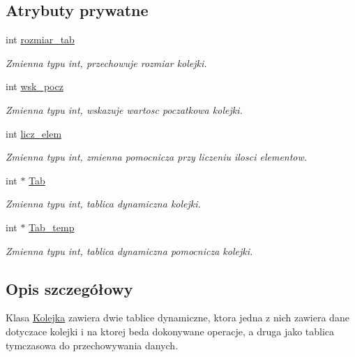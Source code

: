 \subsection*{\-Atrybuty prywatne}
\begin{DoxyCompactItemize}
\item 
int \hyperlink{class_kolejka_a72ba80c6ad16d9e2f5a8a02ec257524b}{rozmiar\-\_\-tab}
\begin{DoxyCompactList}\small\item\em \-Zmienna typu int, przechowuje rozmiar kolejki. \end{DoxyCompactList}\item 
int \hyperlink{class_kolejka_a9fc9f63fded5c275d32f8b05125e8428}{wsk\-\_\-pocz}
\begin{DoxyCompactList}\small\item\em \-Zmienna typu int, wskazuje wartosc poczatkowa kolejki. \end{DoxyCompactList}\item 
int \hyperlink{class_kolejka_a563cd8e3ecaf570a6f8068db62d6c099}{licz\-\_\-elem}
\begin{DoxyCompactList}\small\item\em \-Zmienna typu int, zmienna pomocnicza przy liczeniu ilosci elementow. \end{DoxyCompactList}\item 
int $\ast$ \hyperlink{class_kolejka_adfbcda2500bf9d82a22d8d717ee6f695}{\-Tab}
\begin{DoxyCompactList}\small\item\em \-Zmienna typu int, tablica dynamiczna kolejki. \end{DoxyCompactList}\item 
int $\ast$ \hyperlink{class_kolejka_a5ec5307ce26f31ae9c29f91bd7527225}{\-Tab\-\_\-temp}
\begin{DoxyCompactList}\small\item\em \-Zmienna typu int, tablica dynamiczna pomocnicza kolejki. \end{DoxyCompactList}\end{DoxyCompactItemize}


\subsection{\-Opis szczegółowy}
\-Klasa \hyperlink{class_kolejka}{\-Kolejka} zawiera dwie tablice dynamiczne, ktora jedna z nich zawiera dane dotyczace kolejki i na ktorej beda dokonywane operacje, a druga jako tablica tymczasowa do przechowywania danych. 

